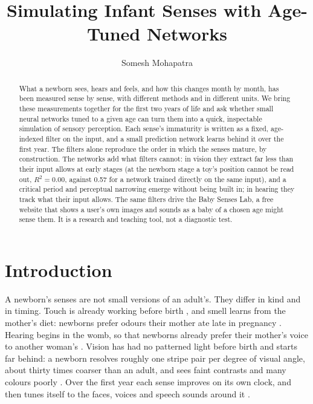 \documentclass{article}
\title{Simulating Infant Senses with Age-Tuned Networks}
\author[1*]{Somesh Mohapatra}
\affil[1]{Independent.}
\affil[*]{Address correspondence to: pikulsomesh@gmail.com}
\date{}
\begin{document}
\maketitle

\begin{abstract}
What a newborn sees, hears and feels, and how this changes month by month, has been measured sense by sense, with different methods and in different units. We bring these measurements together for the first two years of life and ask whether small neural networks tuned to a given age can turn them into a quick, inspectable simulation of sensory perception. Each sense's immaturity is written as a fixed, age-indexed filter on the input, and a small prediction network learns behind it over the first year. The filters alone reproduce the order in which the senses mature, by construction. The networks add what filters cannot: in vision they extract far less than their input allows at early stages (at the newborn stage a toy's position cannot be read out, $R^2 = 0.00$, against 0.57 for a network trained directly on the same input), and a critical period and perceptual narrowing emerge without being built in; in hearing they track what their input allows. The same filters drive the Baby Senses Lab, a free website that shows a user's own images and sounds as a baby of a chosen age might sense them. It is a research and teaching tool, not a diagnostic test.
\end{abstract}


\section{Introduction}

A newborn's senses are not small versions of an adult's. They differ in kind and in timing. Touch is already working before birth \autocite{bremner2017development}, and smell learns from the mother's diet: newborns prefer odours their mother ate late in pregnancy \autocite{schaal2000human}. Hearing begins in the womb, so that newborns already prefer their mother's voice to another woman's \autocite{decasper1980human}. Vision has had no patterned light before birth and starts far behind: a newborn resolves roughly one stripe pair per degree of visual angle, about thirty times coarser than an adult, and sees faint contrasts and many colours poorly \autocite{dobson1978visual,banks1988optical,adams1994systematic}. Over the first year each sense improves on its own clock, and then tunes itself to the faces, voices and speech sounds around it \autocite{werker1984cross,kuhl1992linguistic,pascalis2002species,maurer2014perceptual}.
\end{document}
